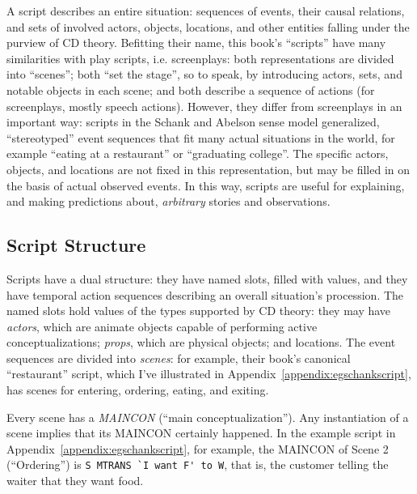 A script describes an entire situation: sequences of events, their causal relations, and sets of involved actors, objects, locations, and other entities falling under the purview of CD theory. Befitting their name, this book's ``scripts'' have many similarities with play scripts, i.e. screenplays: both representations are divided into ``scenes''; both ``set the stage'', so to speak, by introducing actors, sets, and notable objects in each scene; and both describe a sequence of actions (for screenplays, mostly speech actions). However, they differ from screenplays in an important way: scripts in the Schank and Abelson sense model generalized, ``stereotyped'' event sequences that fit many actual situations in the world, for example ``eating at a restaurant'' or ``graduating college''. The specific actors, objects, and locations are not fixed in this representation, but may be filled in on the basis of actual observed events. In this way, scripts are useful for explaining, and making predictions about, \textit{arbitrary} stories and observations.

\subsection{Script Structure}
Scripts have a dual structure: they have named slots, filled with values, %
and they have temporal action sequences describing an overall situation's procession. The named slots hold values of the types supported by CD theory: they may have \textit{actors}, which are animate objects capable of performing active conceptualizations; \textit{props}, which are physical objects; and locations. The event sequences are divided into \textit{scenes}: for example, their book's canonical ``restaurant'' script, which I've illustrated in Appendix~\ref{appendix:egschankscript}, has scenes for entering, ordering, eating, and exiting.

Every scene has a \textit{MAINCON} (``main conceptualization''). Any instantiation of a scene implies that its MAINCON certainly happened. In the example script in Appendix~\ref{appendix:egschankscript}, for example, the MAINCON of Scene 2 (``Ordering'') is \lstinline{S MTRANS `I want F' to W}, that is, the customer telling the waiter that they want food.

